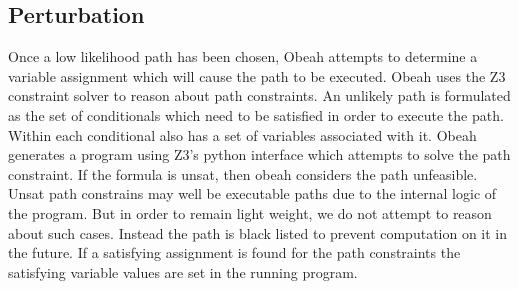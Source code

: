 \subsection{Perturbation}
\label{runtime-pertubation}

Once a low likelihood path has been chosen, Obeah attempts to determine a
variable assignment which will cause the path to be executed. Obeah uses the Z3
constraint solver to reason about path constraints. An unlikely path is
formulated as the set of conditionals which need to be satisfied in order to
execute the path. Within each conditional also has a set of variables
associated with it. Obeah generates a program using Z3's python interface which
attempts to solve the path constraint. If the formula is unsat, then obeah
considers the path unfeasible. Unsat path constrains may well be executable
paths due to the internal logic of the program. But in order to remain light
weight, we do not attempt to reason about such cases. Instead the path is black
listed to prevent computation on it in the future. If a satisfying assignment
is found for the path constraints the satisfying variable values are set in the
running program.




